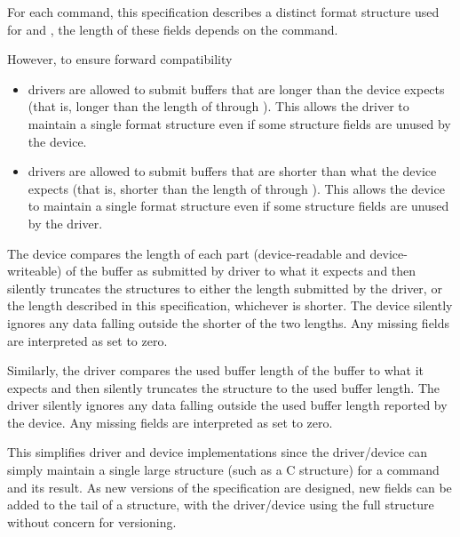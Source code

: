 For each command, this specification describes a distinct
format structure used for  and
, the length of these fields
depends on the command.

However, to ensure forward compatibility
\begin{itemize}
\item drivers are allowed to submit buffers that are longer
than the device expects
(that is, longer than the length of
 through ).
This allows the driver to maintain
a single format structure even if some structure fields are
unused by the device.
\item drivers are allowed to submit buffers that are shorter
than what the device expects
(that is, shorter than the length of  through
). This allows the device to maintain
a single format structure even if some structure fields are
unused by the driver.
\end{itemize}

The device compares the length of each part (device-readable and
device-writeable) of the buffer as submitted by driver to what it
expects and then silently truncates the structures to either the
length submitted by the driver, or the length described in this
specification, whichever is shorter.  The device silently ignores
any data falling outside the shorter of the two lengths. Any
missing fields are interpreted as set to zero.

Similarly, the driver compares the used buffer length
of the buffer to what it expects and then silently
truncates the structure to the used buffer length.
The driver silently ignores any data falling outside
the used buffer length reported by the device.  Any missing
fields are interpreted as set to zero.

This simplifies driver and device implementations since the
driver/device can simply maintain a single large structure (such
as a C structure) for a command and its result. As new versions
of the specification are designed, new fields can be added to the
tail of a structure, with the driver/device using the full
structure without concern for versioning.


